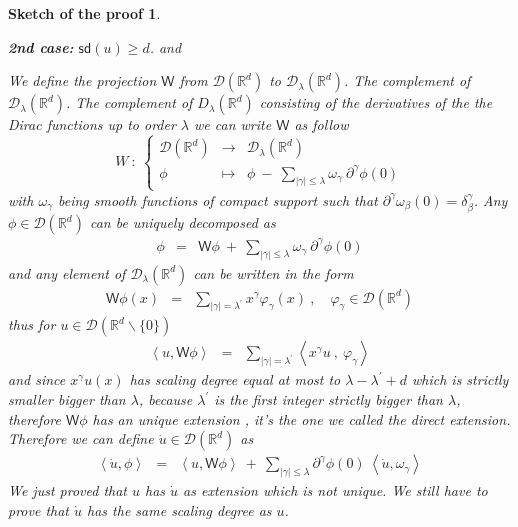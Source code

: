 \documentclass[11pt]{book}
\newcommand{\sd}{\mathsf{sd}}
\newcommand{\abs}[1]{\left|#1\right|}
\newcommand{\sm}[1]{\left\langle#1\right\rangle}
\newcommand{\Dcal}{\mathcal{D}}
\newcommand{\Rbb}{\mathbb{R}}
\newcommand{\Wsf}{\mathsf{W}}
\theoremstyle{break}
\newtheorem{sketch}{Sketch of the proof}[chapter]
\begin{document}
\begin{sketch}
 \begin{center}
  \textbf{2nd case:} $\sd(u)\geq d$. %
  and %
 \end{center}
 We define the projection $\Wsf$ from $\Dcal(\Rbb^d)$ to $\Dcal_\lambda(\Rbb^d)$. The complement of $\Dcal_\lambda(\Rbb^d)$. The complement of $D_\lambda(\Rbb^d)$ consisting of the derivatives of the the Dirac functions up to order $\lambda$ we can write $\Wsf$ as follow
 \begin{equation*}
  W \ : \ \left\{
  \begin{array}{ccl}
   \Dcal(\Rbb^d) & \to & \Dcal_\lambda(\Rbb^d) \\
   \phi & \mapsto & \phi \ - \ \underset{\abs{\gamma}\leq\lambda}{\sum} \omega_\gamma \ \partial^\gamma \phi(0)
  \end{array}
  \right.
 \end{equation*}
 with $\omega_\gamma$ being smooth functions of compact support such that $\partial^\gamma\omega_\beta(0)=\delta^\gamma_\beta$. Any $\phi \in \Dcal(\Rbb^d)$ can be uniquely decomposed as 
 \begin{eqnarray*}
  \phi &=& \Wsf \phi \ + \ \sum_{\abs{\gamma}\leq\lambda} \omega_\gamma \ \partial^\gamma \phi(0)
 \end{eqnarray*}
 and any element of $\Dcal_\lambda(\Rbb^d)$ can be written in the form
 \begin{eqnarray*}
  \Wsf \phi(x) &=& \sum_{\abs{\gamma}=\lambda^\prime} x^\gamma \varphi_\gamma(x) \ , \quad \varphi_\gamma \in \Dcal(\Rbb^d)
 \end{eqnarray*}
 thus for $u \in \Dcal(\Rbb^d \backslash \{0\})$ 
 \begin{eqnarray*}
  \sm{u,\Wsf\phi} &=& \sum_{\abs{\gamma}=\lambda^\prime} \sm{x^\gamma u \ , \ \varphi_\gamma}
 \end{eqnarray*}
 and since $x^\gamma u(x)$ has scaling degree equal at most to $\lambda - \lambda^\prime + d$ which is strictly smaller bigger than $\lambda$, because $\lambda^\prime$ is the first integer strictly bigger than $\lambda$, therefore $\Wsf \phi$ has an unique extension , it's the one we called the direct extension. Therefore we can define $\dot{u} \in \Dcal(\Rbb^d)$ as
 \begin{eqnarray*}
  \sm{\dot{u},\phi} &=& \sm{u,\Wsf\phi} \ + \ \sum_{\abs{\gamma}\leq\lambda} \partial^\gamma \phi(0) \ \sm{\dot{u},\omega_\gamma} 
 \end{eqnarray*}
 We just proved that $u$ has $\dot{u}$ as extension which is not unique. We still have to prove that $\dot{u}$ has the same scaling degree as $u$.
 
\end{sketch}
\end{document}
